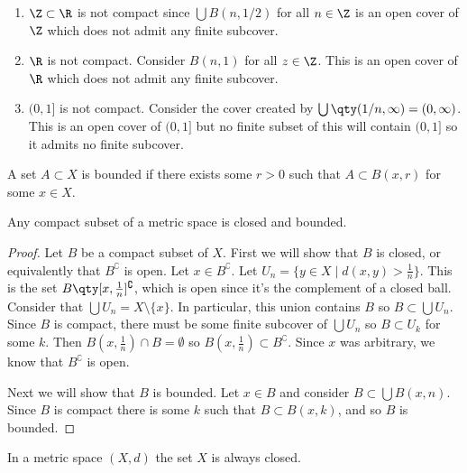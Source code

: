 \begin{example}
\begin{enumerate}
\item $\Z \subset \R$ is not compact since $\bigcup B(n, 1/2)$ for all $n \in \Z$ is an open cover of $\Z$ which does not admit any finite subcover.

\item $\R$ is not compact. Consider $B(n,1)$ for all $z \in \Z$. This is an open cover of $\R$ which does not admit any finite subcover.

\item $(0,1]$ is not compact. Consider the cover created by $\bigcup \qty(1/n, \infty) = (0,\infty)$. This is an open cover of $(0,1]$ but no finite subset of this will contain $(0,1]$ so it admits no finite subcover.
\end{enumerate}
\end{example}

\begin{definition}[Bounded]
A set $A \subset X$ is bounded if there exists some $r > 0$ such that $A \subset B(x,r)$ for some $x \in X$.
\end{definition}

\begin{proposition}
Any compact subset of a metric space is closed and bounded.
\end{proposition}

\begin{proof}
Let $B$ be a compact subset of $X$. First we will show that $B$ is closed, or equivalently that $B^\complement$ is open. Let $x \in B^\complement$. Let $U_n = \{y \in X \mid d(x,y) > \frac{1}{n}\}$. This is the set $B\qty[x,\frac{1}{n}]^\complement$, which is open since it's the complement of a closed ball. Consider that $\bigcup U_n = X \setminus \{x\}$. In particular, this union contains $B$ so $B \subset \bigcup U_n$. Since $B$ is compact, there must be some finite subcover of $\bigcup U_n$ so $B \subset U_k$ for some $k$. Then $B(x,\frac{1}{n}) \cap B = \emptyset$ so $B(x,\frac{1}{n}) \subset B^\complement$. Since $x$ was arbitrary, we know that $B^\complement$ is open.

Next we will show that $B$ is bounded. Let $x \in B$ and consider $B \subset \bigcup B(x,n)$. Since $B$ is compact there is some $k$ such that $B \subset B(x,k)$, and so $B$ is bounded.
\end{proof}

\begin{corollary}
In a metric space $(X,d)$ the set $X$ is always closed.
\end{corollary}

